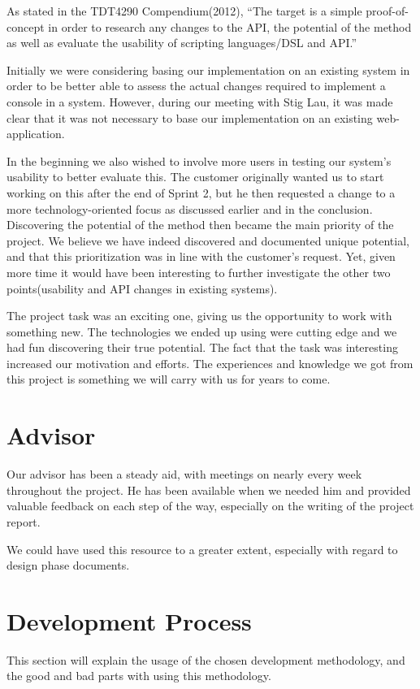 As stated in the TDT4290 Compendium(2012),
“The target is a simple proof-of-concept in order to research any changes to the API, the potential of the method as well as evaluate the usability of scripting languages/DSL and API.”

Initially we were considering basing our implementation on an existing system in order to be better able to assess the actual changes required to implement a console in a system. However, during our meeting with Stig Lau, it was made clear that it was not necessary to base our implementation on an existing web-application.

In the beginning we also wished to involve more users in testing our system’s usability to better evaluate this. The customer originally wanted us to start working on this after the end of Sprint 2, but he then requested a change to a more technology-oriented focus as discussed earlier and in the conclusion. Discovering the potential of the method then became the main priority of the project. We believe we have indeed discovered and documented unique potential, and that this prioritization was in line with the customer’s request. Yet, given more time it would have been interesting to further investigate the other two points(usability and API changes in existing systems).


The project task was an exciting one, giving us the opportunity to work with something new. The technologies we ended up using were cutting edge and we had fun discovering their true potential. The fact that the task was interesting increased our motivation and efforts. The experiences and knowledge we got from this project is something we will carry with us for years to come.

\section{Advisor}
Our advisor has been a steady aid, with meetings on nearly every week throughout the project. He has been available when we needed him and provided valuable feedback on each step of the way, especially on the writing of the project report.

We could have used this resource to a greater extent, especially with regard to design phase documents.

\section{Development Process}
This section will explain the usage of the chosen development methodology, and the good and bad parts with using this methodology.

